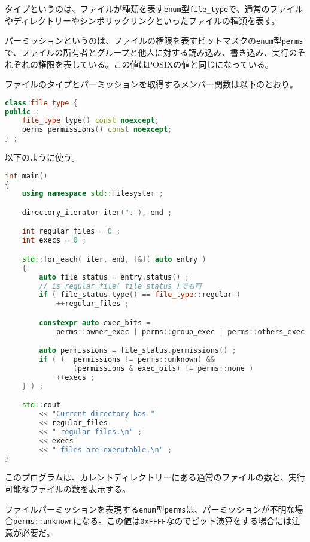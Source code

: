 タイプというのは、ファイルが種類を表す\lstinline!enum!型\lstinline!file_type!で、通常のファイルやディレクトリーやシンボリックリンクといったファイルの種類を表す。

パーミッションというのは、ファイルの権限を表すビットマスクの\lstinline!enum!型\lstinline!perms!で、ファイルの所有者とグループと他人に対する読み込み、書き込み、実行のそれぞれの権限を表している。この値はPOSIXの値と同じになっている。

ファイルのタイプとパーミッションを取得するメンバー関数は以下のとおり。

\begin{lstlisting}[language=C++]
class file_type {
public :
    file_type type() const noexcept;
    perms permissions() const noexcept;
} ;
\end{lstlisting}

以下のように使う。

\begin{lstlisting}[language=C++]
int main()
{
    using namespace std::filesystem ;

    directory_iterator iter("."), end ;

    int regular_files = 0 ;
    int execs = 0 ;

    std::for_each( iter, end, [&]( auto entry )
    {
        auto file_status = entry.status() ;
        // is_regular_file( file_status )でも可
        if ( file_status.type() == file_type::regular )
            ++regular_files ;

        constexpr auto exec_bits = 
            perms::owner_exec | perms::group_exec | perms::others_exec ;

        auto permissions = file_status.permissions() ;
        if ( (  permissions != perms::unknown) &&
                (permissions & exec_bits) != perms::none ) 
            ++execs ;
    } ) ;

    std::cout
        << "Current directory has "
        << regular_files
        << " regular files.\n" ;
        << execs
        << " files are executable.\n" ;
}
\end{lstlisting}

このプログラムは、カレントディレクトリーにある通常のファイルの数と、実行可能なファイルの数を表示する。

ファイルパーミッションを表現する\lstinline!enum!型\lstinline!perms!は、パーミッションが不明な場合\lstinline!perms::unknown!になる。この値は\lstinline!0xFFFF!なのでビット演算をする場合には注意が必要だ。

